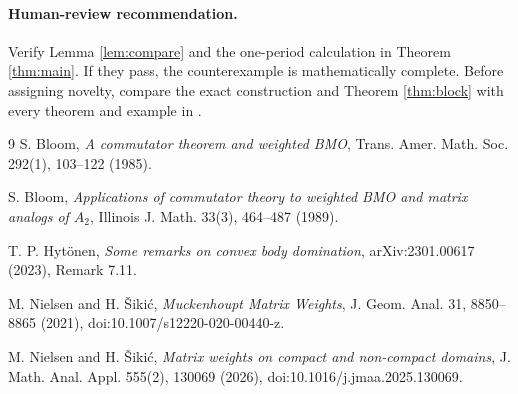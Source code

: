 \documentclass[10pt]{article}
\begin{document}
\paragraph{Human-review recommendation.}
Verify Lemma \ref{lem:compare} and the one-period calculation in Theorem
\ref{thm:main}.  If they pass, the counterexample is mathematically complete.
Before assigning novelty, compare the exact construction and Theorem
\ref{thm:block} with every theorem and example in \cite{NielsenSikic2026}.

\begin{thebibliography}{9}
S. Bloom, \emph{A commutator theorem and weighted BMO}, Trans. Amer. Math.
Soc. 292(1), 103--122 (1985).

S. Bloom, \emph{Applications of commutator theory to weighted BMO and matrix
analogs of $A_2$}, Illinois J. Math. 33(3), 464--487 (1989).

T. P. Hytönen, \emph{Some remarks on convex body domination}, arXiv:2301.00617
(2023), Remark 7.11.

M. Nielsen and H. Šikić, \emph{Muckenhoupt Matrix Weights}, J. Geom. Anal. 31,
8850--8865 (2021), doi:10.1007/s12220-020-00440-z.

M. Nielsen and H. Šikić, \emph{Matrix weights on compact and non-compact
domains}, J. Math. Anal. Appl. 555(2), 130069 (2026),
doi:10.1016/j.jmaa.2025.130069.
\end{thebibliography}
\end{document}
